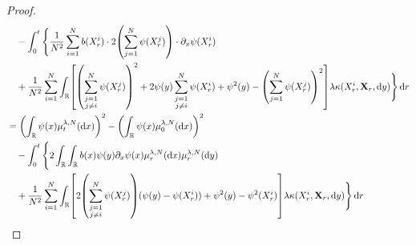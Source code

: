 \begin{proof}
\begin{equation}
\begin{split}
                                               & \quad {} - \int_0^t \Bigg\{ \frac{1}{N^2} \sum_{i=1}^N b(X_r^i) \cdot 2 \br*{ \sum_{j=1}^N \psi(X_r^j) } \cdot \partial_x \psi(X_r^i)                                                                                                                                                                      \\
                                               & \quad + \frac{1}{N^2} \sum_{i=1}^N \int_\potspace \sbr*{ \br*{ \sum_{\substack{j=1                                                                                                                                                                                                                         \\ j \neq i}}^N \psi(X_r^j) }^2 + 2 \psi(y) \sum_{\substack{j=1 \\ j \neq i}}^N \psi(X_r^i) + \psi^2(y) - \br*{ \sum_{j=1}^N \psi(X_r^j) }^2 } \lambda \kappa(X_r^i,\bm{X}_r,\odif{y}) \Bigg\} \odif{r} \\
                                               & = \br*{ \int_\potspace \psi(x) \mu_t^{\lambda, N}(\odif{x}) }^2 - \br*{ \int_\potspace \psi(x) \mu_0^{\lambda, N}(\odif{x}) }^2                                                                                                                                                                            \\
                                               & \quad {} - \int_0^t \Bigg\{ 2 \int_\potspace \int_\potspace b(x) \psi(y) \partial_x \psi (x) \mu_r^{\lambda,N}(\odif{x}) \mu_r^{\lambda,N}(\odif{y})                                                                                                                                                       \\
                                               & \quad + \frac{1}{N^2} \sum_{i=1}^N \int_\potspace \sbr*{ 2 \br*{\sum_{\substack{j=1                                                                                                                                                                                                                        \\ j \neq i}}^N \psi(X_r^j)} (\psi(y) - \psi(X_r^i)) + \psi^2(y) - \psi^2(X_r^i) } \lambda \kappa(X_r^i,\bm{X}_r,\odif{y}) \Bigg\} \odif{r} \\

\end{split}
\end{equation}
\end{proof}
